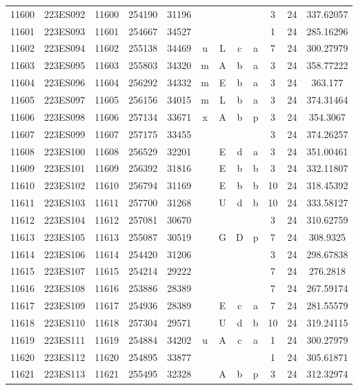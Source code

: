 \begin{tabular}{|*{12}{c|}}
11600 & 223ES092 & 11600 & 254190 & 31196 &  &  &  &  & 3 & 24 & 337.62057 \\ 
11601 & 223ES093 & 11601 & 254667 & 34527 &  &  &  &  & 1 & 24 & 285.16296 \\ 
11602 & 223ES094 & 11602 & 255138 & 34469 & u & L & c & a & 7 & 24 & 300.27979 \\ 
11603 & 223ES095 & 11603 & 255803 & 34320 & m & A & b & a & 3 & 24 & 358.77222 \\ 
11604 & 223ES096 & 11604 & 256292 & 34332 & m & E & b & a & 3 & 24 & 363.177 \\ 
11605 & 223ES097 & 11605 & 256156 & 34015 & m & L & b & a & 3 & 24 & 374.31464 \\ 
11606 & 223ES098 & 11606 & 257134 & 33671 & x & A & b & p & 3 & 24 & 354.3067 \\ 
11607 & 223ES099 & 11607 & 257175 & 33455 &  &  &  &  & 3 & 24 & 374.26257 \\ 
11608 & 223ES100 & 11608 & 256529 & 32201 &  & E & d & a & 3 & 24 & 351.00461 \\ 
11609 & 223ES101 & 11609 & 256392 & 31816 &  & E & b & b & 3 & 24 & 332.11807 \\ 
11610 & 223ES102 & 11610 & 256794 & 31169 &  & E & b & b & 10 & 24 & 318.45392 \\ 
11611 & 223ES103 & 11611 & 257700 & 31268 &  & U & d & b & 10 & 24 & 333.58127 \\ 
11612 & 223ES104 & 11612 & 257081 & 30670 &  &  &  &  & 3 & 24 & 310.62759 \\ 
11613 & 223ES105 & 11613 & 255087 & 30519 &  & G & D & p & 7 & 24 & 308.9325 \\ 
11614 & 223ES106 & 11614 & 254420 & 31206 &  &  &  &  & 3 & 24 & 298.67838 \\ 
11615 & 223ES107 & 11615 & 254214 & 29222 &  &  &  &  & 7 & 24 & 276.2818 \\ 
11616 & 223ES108 & 11616 & 253886 & 28389 &  &  &  &  & 7 & 24 & 267.59174 \\ 
11617 & 223ES109 & 11617 & 254936 & 28389 &  & E & c & a & 7 & 24 & 281.55579 \\ 
11618 & 223ES110 & 11618 & 257304 & 29571 &  & U & d & b & 10 & 24 & 319.24115 \\ 
11619 & 223ES111 & 11619 & 254884 & 34202 & u & A & c & a & 1 & 24 & 300.27979 \\ 
11620 & 223ES112 & 11620 & 254895 & 33877 &  &  &  &  & 1 & 24 & 305.61871 \\ 
11621 & 223ES113 & 11621 & 255495 & 32328 &  & A & b & p & 3 & 24 & 312.32974 \\ 

\end{tabular}
